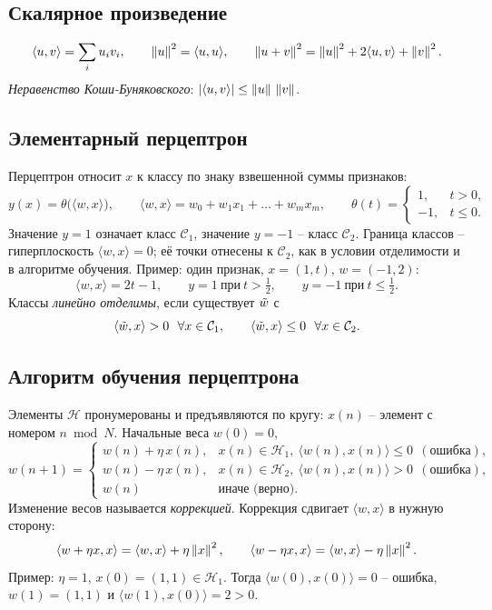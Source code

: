 \documentclass[12pt,a4paper]{article}
\begin{document}
\subsection{Скалярное произведение}

\[
  \langle u, v\rangle = \sum_i u_iv_i, \qquad
  \left\lVert u \right\rVert^2 = \langle u, u\rangle, \qquad
  \left\lVert u + v \right\rVert^2 = \left\lVert u \right\rVert^2 + 2\langle u, v\rangle + \left\lVert v \right\rVert^2 .
\]
\emph{Неравенство Коши-Буняковского}:
$\left\lvert \langle u, v\rangle \right\rvert \le \left\lVert u \right\rVert\,\left\lVert v \right\rVert$.

\subsection{Элементарный перцептрон}

Перцептрон относит $x$ к классу по знаку взвешенной суммы признаков:
\[
  y(x) = \theta\bigl(\langle w, x\rangle\bigr), \qquad
  \langle w, x\rangle = w_0 + w_1x_1 + \dots + w_mx_m, \qquad
  \theta(t) = \begin{cases}
    1, & t > 0,\\
    -1, & t \le 0.
  \end{cases}
\]
Значение $y = 1$ означает класс $\mathcal{C}_1$, значение $y = -1$ -- класс
$\mathcal{C}_2$.
Граница классов -- гиперплоскость $\langle w, x\rangle = 0$; её точки отнесены к
$\mathcal{C}_2$, как в условии отделимости и в алгоритме обучения. Пример: один
признак, $x = (1, t)$, $w = (-1, 2)$:
\[
  \langle w, x\rangle = 2t - 1, \qquad
  y = 1 \ \text{при}\ t > \tfrac12, \qquad
  y = -1 \ \text{при}\ t \le \tfrac12 .
\]
Классы \emph{линейно отделимы}, если существует $\tilde{w}$ с
\[
  \langle \tilde{w}, x\rangle > 0 \ \ \forall x \in \mathcal{C}_1,
  \qquad
  \langle \tilde{w}, x\rangle \le 0 \ \ \forall x \in \mathcal{C}_2 .
\]

\subsection{Алгоритм обучения перцептрона}

Элементы $\mathcal{H}$ пронумерованы и предъявляются по кругу: $x(n)$ --
элемент с номером $n \bmod N$. Начальные веса $w(0) = 0$,
\[
  w(n+1) =
  \begin{cases}
    w(n) + \eta\,x(n), & x(n) \in \mathcal{H}_1,\ \langle w(n), x(n)\rangle \le 0
      \ \ (\text{ошибка}),\\
    w(n) - \eta\,x(n), & x(n) \in \mathcal{H}_2,\ \langle w(n), x(n)\rangle > 0
      \ \ (\text{ошибка}),\\
    w(n) & \text{иначе (верно)}.
  \end{cases}
\]
Изменение весов называется \emph{коррекцией}. Коррекция сдвигает
$\langle w, x\rangle$ в нужную сторону:
\begin{equation}\label{eq:shift}
  \langle w + \eta x, x\rangle = \langle w, x\rangle + \eta\left\lVert x \right\rVert^2,
  \qquad
  \langle w - \eta x, x\rangle = \langle w, x\rangle - \eta\left\lVert x \right\rVert^2 .
\end{equation}
Пример: $\eta = 1$, $x(0) = (1, 1) \in \mathcal{H}_1$. Тогда
$\langle w(0), x(0)\rangle = 0$ -- ошибка, $w(1) = (1, 1)$ и
$\langle w(1), x(0)\rangle = 2 > 0$.
\end{document}
